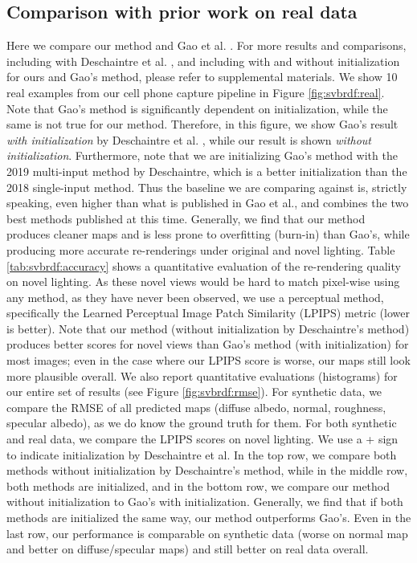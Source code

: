 

\subsection{Comparison with prior work on real data}
\label{ssec:real}



Here we compare our method and Gao et al. \cite{Gao2019}. For more results and comparisons, including with Deschaintre et al. \cite{Deschaintre2019}, and including with and without initialization for ours and Gao's method, please refer to supplemental materials.
We show 10 real examples from our cell phone capture pipeline in Figure \ref{fig:svbrdf:real}. Note that Gao's method is significantly dependent on initialization, while the same is not true for our method. Therefore, in this figure, we show Gao's result \emph{with initialization} by Deschaintre et al. \cite{Deschaintre2019}, while our result is shown \emph{without initialization}.
Furthermore, note that we are initializing Gao's method with the 2019 multi-input method by Deschaintre, which is a better initialization than the 2018 single-input method. Thus the baseline we are comparing against is, strictly speaking, even higher than what is published in Gao et al., and combines the two best methods published at this time.
Generally, we find that our method produces cleaner maps and is less prone to overfitting (burn-in) than Gao's, while producing more accurate re-renderings under original and novel lighting. Table \ref{tab:svbrdf:accuracy} shows a quantitative evaluation of the re-rendering quality on novel lighting. As these novel views would be hard to match pixel-wise using any method, as they have never been observed, we use a perceptual method, specifically the Learned Perceptual Image Patch Similarity (LPIPS) metric \cite{LPIPS} (lower is better). Note that our method (without initialization by Deschaintre's method) produces better scores for novel views than Gao's method (with initialization) for most images; even in the case where our LPIPS score is worse, our maps still look more plausible overall.
We also report quantitative evaluations (histograms) for our entire set of results (see Figure \ref{fig:svbrdf:rmse}). For synthetic data, we compare the RMSE of all predicted maps (diffuse albedo, normal, roughness, specular albedo), as we do know the ground truth for them. For both synthetic and real data, we compare the LPIPS scores on novel lighting. We use a + sign to indicate initialization by Deschaintre et al. In the top row, we compare both methods without initialization by Deschaintre's method, while in the middle row, both methods are initialized, and in the bottom row, we compare our method without initialization to Gao's with initialization. Generally, we find that if both methods are initialized the same way, our method outperforms Gao's. Even in the last row, our performance is comparable on synthetic data (worse on normal map and better on diffuse/specular maps) and still better on real data overall.

